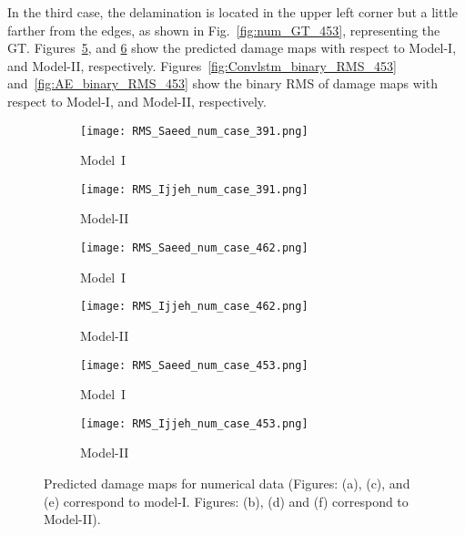 \begin{sloppypar}
	
	In the third case, the delamination is located in the upper left corner but a little farther from the edges, as shown in Fig.~\ref{fig:num_GT_453}, representing the GT. 
	Figures~\ref{fig:Convlstm_num_453}, and \ref{fig:AE_num_453} show the predicted damage maps with respect to Model-I, and Model-II, respectively.
	Figures~\ref{fig:Convlstm_binary_RMS_453} and~\ref{fig:AE_binary_RMS_453} show the binary RMS of damage maps with respect to Model-I, and Model-II, respectively.
	
	\begin{figure} [!ht]
		\centering
		\begin{subfigure}[b]{0.48\textwidth}
			\centering
			\texttt{[image: RMS\_Saeed\_num\_case\_391.png]} 
			\caption{Model~I}
			\label{fig:Convlstm_num_391}
		\end{subfigure}
		\hfill
		\begin{subfigure}[b]{0.48\textwidth}
			\centering
			\texttt{[image: RMS\_Ijjeh\_num\_case\_391.png]}
			\caption{Model-II}
			\label{fig:AE_num_391}
		\end{subfigure}
		\par\medskip
		\begin{subfigure}[b]{0.48\textwidth}
			\centering
			\texttt{[image: RMS\_Saeed\_num\_case\_462.png]}
			\caption{Model~I}
			\label{fig:Convlstm_num_462}
		\end{subfigure}
		\hfill
		\begin{subfigure}[b]{0.48\textwidth}
			\centering
			\texttt{[image: RMS\_Ijjeh\_num\_case\_462.png]}
			\caption{Model-II}
			\label{fig:AE_num_462}
		\end{subfigure}
		\par\medskip
		\begin{subfigure}[b]{0.48\textwidth}
			\centering
			\texttt{[image: RMS\_Saeed\_num\_case\_453.png]}
			\caption{Model~I}
			\label{fig:Convlstm_num_453}
		\end{subfigure}
		\hfill	
		\begin{subfigure}[b]{0.48\textwidth}
			\centering
			\texttt{[image: RMS\_Ijjeh\_num\_case\_453.png]}
			\caption{Model-II}
			\label{fig:AE_num_453}
		\end{subfigure}
		\caption{Predicted damage maps for numerical data (Figures: (a), (c), and (e) correspond to model-I. 
			Figures: (b), (d) and (f) correspond to Model-II).}
		\label{fig:num_case}
	\end{figure} 
	

\end{sloppypar}
